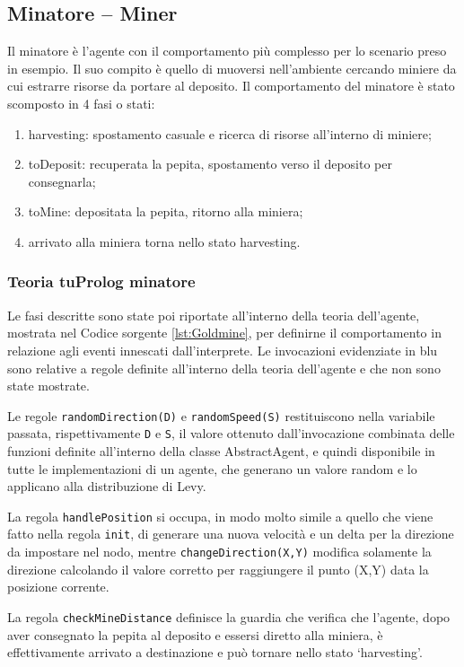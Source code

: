 \subsection{Minatore -- Miner}
Il minatore è l'agente con il comportamento più complesso per lo scenario preso in esempio.
Il suo compito è quello di muoversi nell'ambiente cercando miniere da cui estrarre risorse da portare al deposito.
Il comportamento del minatore è stato scomposto in 4 fasi o stati:
\begin{enumerate}
\item harvesting: spostamento casuale e ricerca di risorse all'interno di miniere;
\item toDeposit: recuperata la pepita, spostamento verso il deposito per consegnarla;
\item toMine: depositata la pepita, ritorno alla miniera;
\item arrivato alla miniera torna nello stato harvesting.
\end{enumerate}

\subsubsection{Teoria tuProlog minatore}
Le fasi descritte sono state poi riportate all'interno della teoria dell'agente, mostrata nel Codice sorgente \ref{lst:Goldmine}, per definirne il comportamento in relazione agli eventi innescati dall'interprete. Le invocazioni evidenziate in blu sono relative a regole definite all'interno della teoria dell'agente e che non sono state mostrate.

Le regole \texttt{randomDirection(D)} e \texttt{randomSpeed(S)} restituiscono nella variabile passata, rispettivamente \texttt{D} e \texttt{S}, il valore ottenuto dall'invocazione combinata delle funzioni definite all'interno della classe AbstractAgent, e quindi disponibile in tutte le implementazioni di un agente, che generano un valore random e lo applicano alla distribuzione di Levy.

La regola \texttt{handlePosition} si occupa, in modo molto simile a quello che viene fatto nella regola \texttt{init}, di generare una nuova velocità e un delta per la direzione da impostare nel nodo, mentre \texttt{changeDirection(X,Y)} modifica solamente la direzione calcolando il valore corretto per raggiungere il punto (X,Y) data la posizione corrente.

La regola \texttt{checkMineDistance} definisce la guardia che verifica che l'agente, dopo aver consegnato la pepita al deposito e essersi diretto alla miniera, è effettivamente arrivato a destinazione e può tornare nello stato `harvesting'.

